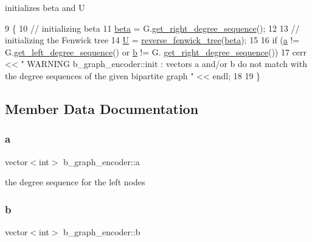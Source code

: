 initializes beta and U 


\begin{DoxyCode}
9 \{
10   \textcolor{comment}{// initializing beta}
11   \hyperlink{classb__graph__encoder_ae54d76cc4cee399d98951f870897a144}{beta} = G.\hyperlink{classb__graph_a2711566385b92b02f4c03abdc1f9a582}{get\_right\_degree\_sequence}();
12 
13   \textcolor{comment}{// initializing the Fenwick tree}
14   \hyperlink{classb__graph__encoder_ac810138443002a2b2cf579ced2dc34ce}{U} = \hyperlink{classreverse__fenwick__tree}{reverse\_fenwick\_tree}(\hyperlink{classb__graph__encoder_ae54d76cc4cee399d98951f870897a144}{beta});
15 
16   \textcolor{keywordflow}{if} (\hyperlink{classb__graph__encoder_afd22d167f495cd85b41397f337c377c2}{a} != G.\hyperlink{classb__graph_afd65fb655f7e24217393a10533b87d3c}{get\_left\_degree\_sequence}() or \hyperlink{classb__graph__encoder_a767826e268702e45ab71565e096a52b8}{b} != G.
      \hyperlink{classb__graph_a2711566385b92b02f4c03abdc1f9a582}{get\_right\_degree\_sequence}())
17     cerr << \textcolor{stringliteral}{" WARNING b\_graph\_encoder::init : vectors a and/or b do not match with the degree sequences of
       the given bipartite graph  "} << endl;
18 
19 \}
\end{DoxyCode}


\subsection{Member Data Documentation}
\mbox{\label{classb__graph__encoder_afd22d167f495cd85b41397f337c377c2}} 
\subsubsection{\texorpdfstring{a}{a}}
{\footnotesize\ttfamily vector$<$int$>$ b\+\_\+graph\+\_\+encoder\+::a\hspace{0.3cm}{\ttfamily [private]}}



the degree sequence for the left nodes 

\mbox{\label{classb__graph__encoder_a767826e268702e45ab71565e096a52b8}} 
\subsubsection{\texorpdfstring{b}{b}}
{\footnotesize\ttfamily vector$<$int$>$ b\+\_\+graph\+\_\+encoder\+::b\hspace{0.3cm}{\ttfamily [private]}}



